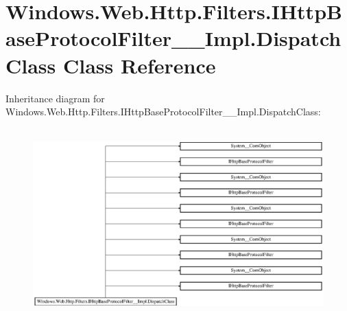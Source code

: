 \hypertarget{class_windows_1_1_web_1_1_http_1_1_filters_1_1_i_http_base_protocol_filter_____impl_1_1_dispatch_class}{}\section{Windows.\+Web.\+Http.\+Filters.\+I\+Http\+Base\+Protocol\+Filter\+\_\+\+\_\+\+Impl.\+Dispatch\+Class Class Reference}
\label{class_windows_1_1_web_1_1_http_1_1_filters_1_1_i_http_base_protocol_filter_____impl_1_1_dispatch_class}
Inheritance diagram for Windows.\+Web.\+Http.\+Filters.\+I\+Http\+Base\+Protocol\+Filter\+\_\+\+\_\+\+Impl.\+Dispatch\+Class\+:\begin{figure}[H]
\begin{center}
\leavevmode
\includegraphics[height=7.386091cm]{class_windows_1_1_web_1_1_http_1_1_filters_1_1_i_http_base_protocol_filter_____impl_1_1_dispatch_class}
\end{center}
\end{figure}
